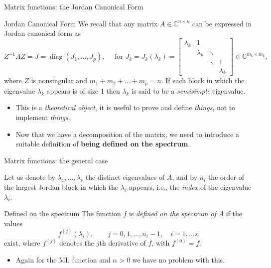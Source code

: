 \documentclass[aspectratio=169,xcolor=dvipsnames]{beamer}
\begin{document}
\begin{frame}{Matrix functions: the Jordan Canonical Form}

\begin{block}{Jordan Canonical Form}
We recall that any matrix $A \in \mathbb{C}^{n \times n}$ can be expressed in Jordan canonical
form as
\begin{equation*}
Z^{-1} A Z = J = \operatorname{diag}(J_1,\ldots,J_p), \quad \text{ for }
J_k = J_k(\lambda_k) = \begin{bmatrix}
\lambda_k & 1 \\
& \lambda_k & \ddots \\
& & \ddots & 1 \\
& & & \lambda_k
\end{bmatrix} \in \mathbb{C}^{m_k \times m_k},
\end{equation*}
where $Z$ is nonsingular and $m_1 + m_2 + \ldots + m_p = n$. If each block in which the eigenvalue $\lambda_k$ appears is of size 1 then $\lambda_k$ is said to be a \textit{semisimple} eigenvalue.
\end{block}
\begin{itemize}
	\item This is a \emph{theoretical object}, it is useful to prove and define \emph{things}, \alert{not to implement \emph{things}}.
	\item<2-> Now that we have a decomposition of the matrix, we need to introduce a suitable definition of \textbf{being defined on the spectrum}.
\end{itemize}

\end{frame}

\begin{frame}{Matrix functions: the general case}

Let us denote by $\lambda_1,\ldots,\lambda_s$ the distinct
eigenvalues of $A$, and by $n_i$ the order of the largest Jordan block in
which the $\lambda_i$ appears, i.e., the \textit{index} of the eigenvalue
$\lambda_i$.

\begin{block}{Defined on the spectrum}
The function $f$ is \textit{defined on the spectrum of} $A$ if the values
\begin{equation*}
f^{(j)}(\lambda_i), \qquad j=0,1,\ldots,n_i-1, \quad i = 1,\ldots s,
\end{equation*}
exist, where $f^{(j)}$ denotes the $j$th derivative of $f$, with $f^{(0)} = f$.
\end{block}

\begin{itemize}
	\item[\faExclamationTriangle]<2-> Again for the ML function and $\alpha > 0$ we have no problem with this. 
\end{itemize}

\end{frame}
\end{document}
